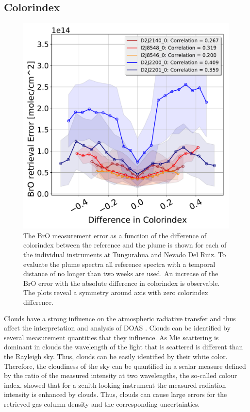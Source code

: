 \subsection{ Colorindex}
	\begin{figure}
	\centering
	\includegraphics[width=0.7\linewidth]{Bilder/DiffColidxallInstruments}
	\caption{The BrO measurement error as a function of the difference of colorindex between the reference and the plume is shown for each of the individual instruments at Tungurahua and Nevado Del Ruiz. To evaluate the plume spectra all reference spectra with a temporal distance of no longer than two weeks are used. An increase of the BrO error with the absolute difference in colorindex is observable. The plots reveal a symmetry around axis with zero colorindex difference. }
	\label{fig:diffcolidx}
\end{figure}
Clouds  have  a  strong  influence  on  the  atmospheric  radiative  transfer  and  thus  affect  the  interpretation  and  analysis of DOAS \citep{wagner2014cloud}.
Clouds can be identified by several measurement quantities that they influence.
As Mie scattering is dominant in clouds the wavelength of the light that is scattered is different than the Rayleigh sky. Thus, clouds can be easily identified by their white color.
Therefore, the cloudiness of the sky can be quantified in a scalar measure defined by the ratio of the measured intensity at two wavelengths, the so-called colour index.
\cite{wagner2014cloud} showed that for a zenith-looking instrument the measured radiation intensity is enhanced by clouds. Thus, clouds can cause large errors for the retrieved gas column density and the corresponding uncertainties. 
